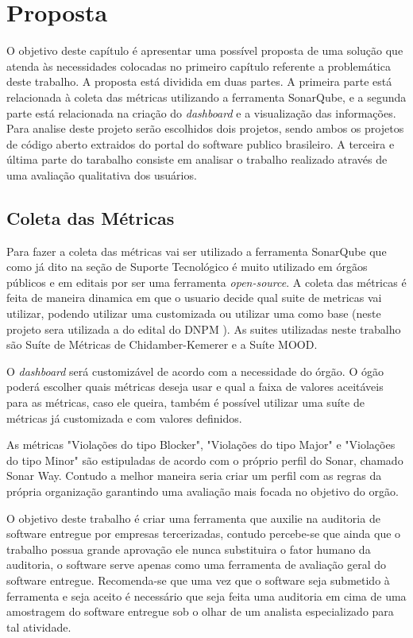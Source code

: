 \chapter[Proposta]{Proposta}
O objetivo deste capítulo é apresentar uma possível proposta de uma solução que atenda às necessidades colocadas no primeiro capítulo referente a problemática deste trabalho. A proposta está dividida em duas partes. A primeira parte está relacionada à coleta das métricas utilizando a ferramenta SonarQube, e a segunda parte está relacionada na criação do \textit{dashboard} e a visualização das informações. Para analise deste projeto serão escolhidos dois projetos, sendo ambos os projetos de código aberto extraidos do portal do software publico brasileiro. A terceira e última parte do tarabalho consiste em analisar o trabalho realizado através de uma avaliação qualitativa dos usuários.
\section{Coleta das Métricas}
Para fazer a coleta das métricas vai ser utilizado a ferramenta SonarQube que como já dito na seção de Suporte Tecnológico é muito utilizado em órgãos públicos e em editais por ser uma ferramenta \textit{open-source}. A coleta das métricas é feita de maneira dinamica em que o usuario decide qual suite de metricas vai utilizar, podendo utilizar uma customizada ou utilizar uma como base (neste projeto sera utilizada a do edital do DNPM \cite{edital}). As suites utilizadas neste trabalho são Suíte de Métricas de Chidamber-Kemerer e a Suíte MOOD.

O \textit{dashboard} será customizável de acordo com a necessidade do órgão. O ógão poderá escolher quais métricas deseja usar e qual a faixa de valores aceitáveis para as métricas, caso ele queira, também é possível utilizar uma suíte de métricas já customizada e com valores definidos. 

As métricas "Violações do tipo Blocker", "Violações do tipo Major" e "Violações do tipo Minor" são estipuladas de acordo com o próprio perfil do Sonar, chamado Sonar Way. Contudo a melhor maneira seria criar um perfil com as regras da própria organização garantindo uma avaliação mais focada no objetivo do orgão.

O objetivo deste trabalho é criar uma ferramenta que auxilie na auditoria de software entregue por empresas tercerizadas, contudo percebe-se que ainda que o trabalho possua grande aprovação ele nunca substituira o fator humano da auditoria, o software serve apenas como uma ferramenta de avaliação geral do software entregue. Recomenda-se que uma vez que o software seja submetido à ferramenta e seja aceito é necessário que seja feita uma auditoria em cima de uma amostragem do software entregue sob o olhar de um analista especializado para tal atividade.
